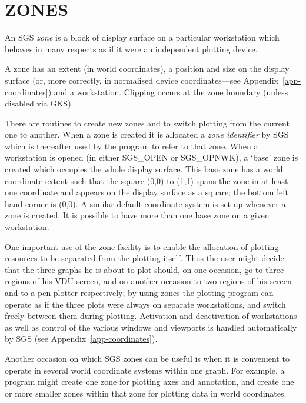 \documentclass[11pt]{article}
\newcommand{\hyperref}[4]{#2\ref{#4}#3}
\newcommand{\htmlref}[2]{#1}
\begin{document}
\section {\label{zones}ZONES}

An SGS {\em zone}\/ is a block of display surface on a particular
workstation which behaves in many respects
as if it were an independent plotting device.

A zone has an extent (in world coordinates), a
position and size on the display surface (or, more correctly,
in normalised device coordinates---see
\hyperref{this appendix}{Appendix~}{}{app-coordinates}) and a workstation.
Clipping occurs at the zone boundary (unless disabled via GKS).

There are routines to create new
zones and to switch plotting from the
current one to another.  When
a zone is created it is allocated a {\em zone identifier}\/ by SGS
which is thereafter used by the program to refer to that
zone.  When a workstation is opened (in either
\htmlref{SGS\_OPEN}{SGS_OPEN} or
\htmlref{SGS\_OPNWK}{SGS_OPNWK}), a `base' zone is created which occupies the
whole display surface.  This base zone has a world coordinate
extent such that the square (0,0) to (1,1) spans the
zone in
at least one
coordinate and appears on the display surface as
a square;  the bottom left hand corner is (0,0).  A similar
default coordinate system is set
up whenever a zone is created.  It is possible
to have more than one base zone on a given workstation.

One important use of the zone
facility is to enable the allocation of plotting
resources to be separated from the plotting itself.  Thus
the user might decide that the three graphs he is about
to plot should, on one occasion, go to three regions of
his VDU screen, and on another occasion to two regions
of his screen and to a pen plotter respectively;  by using
zones the plotting program can operate as if the three
plots were always on separate workstations, and switch freely
between them during plotting.  Activation and deactivation
of workstations as well as
control of the various windows and viewports is handled automatically
by SGS (see \hyperref{this appendix}{Appendix~}{}{app-coordinates}).

Another occasion on which SGS zones can be useful is when
it is convenient to operate in
several world coordinate systems within one graph.  For
example, a program might create one zone
for plotting axes and annotation, and create one or more smaller
zones within that zone for plotting data in world
coordinates.
\end{document}
